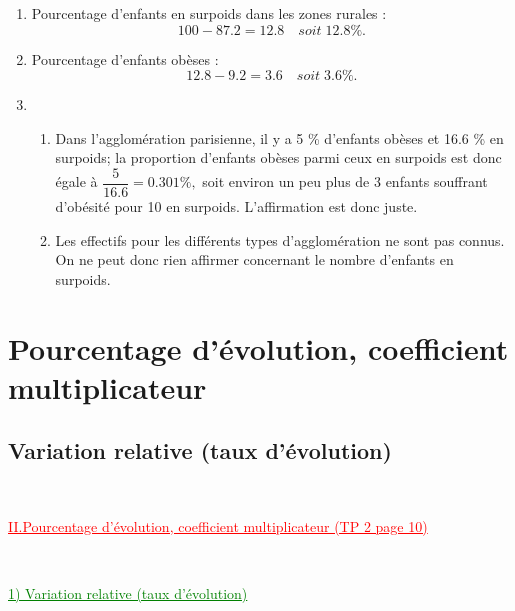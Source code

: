 \documentclass[xcolor={dvipsnames}]{beamer}
\begin{document}
\begin{frame}{}
\begin{enumerate}
	\item  Pourcentage d'enfants en surpoids dans les zones rurales :\pause
	\begin{equation*}
	\num{100} - \num{87.2} = \num{12.8} \quad soit \; \num{12.8} \%.
	\end{equation*}\pause
	
	 
	
	\item  Pourcentage d'enfants obèses :\pause
	\begin{equation*}
	\num{12.8} - \num{9.2} = \num{3.6} \quad soit \; \num{3.6} \%.
	\end{equation*}\pause
	
	\item \begin{enumerate}[a]
		\item Dans l'agglomération parisienne, il y a \num{5} \% d'enfants obèses et \num{16.6} \% en surpoids; la proportion d'enfants obèses parmi ceux en surpoids est donc égale à $\dfrac{5}{\num{16.6}}=\num{0.301} \%,$ soit environ un peu plus de 3 enfants souffrant d'obésité pour 10 en surpoids. L'affirmation est donc juste.\pause
		
		\item Les effectifs pour les différents types d'agglomération ne sont pas connus. On ne peut donc rien affirmer concernant le nombre d'enfants en surpoids.
	\end{enumerate}
	
	
\end{enumerate}
\end{frame}

\section{Pourcentage d'évolution, coefficient multiplicateur}

\subsection{Variation relative (taux d'évolution)}

\begin{frame}
\

\begin{Large}
	\textcolor{Red}{\underline{II.Pourcentage d'évolution, coefficient multiplicateur (TP 2 page 10)}}
\end{Large}\pause
\

\vspace*{1cm}

\textcolor{Green}{\underline{1) Variation relative (taux d'évolution)}}
\end{frame}
\end{document}
